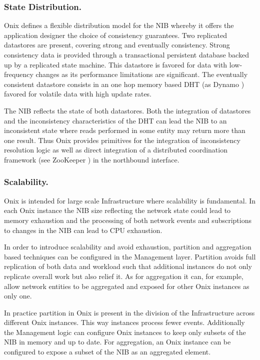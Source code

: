 \subsubsection{State Distribution.} Onix defines a flexible distribution model for the NIB 
whereby  it offers the application
designer the choice of consistency guarantees. Two
replicated datastores are present, covering  strong 
and  eventually consistency. Strong consistency data is
provided through a transactional persistent database backed up by a replicated
state machine. This datastore is
favored for data with low-frequency changes  as its performance limitations are
significant. The eventually consistent datastore consists in 
an one hop memory based DHT  (as Dynamo 
\cite{DeCandia:2007cn}) favored for  volatile data with high update
rates. 

The NIB reflects the state of both datastores. Both the integration of
datastores and the inconsistency  characteristics of the DHT can lead the
NIB to an inconsistent state where reads performed in some entity may
return more than one result. Thus Onix provides primitives
for the integration of inconsistency resolution logic as well as 
direct integration of a distributed
coordination framework (see  ZooKeeper \cite{Hunt:2010ux}) in the
northbound interface. 

\subsubsection{Scalability.} Onix is intended for large scale Infrastructure where scalability is
fundamental. In each Onix instance the NIB
size reflecting the network state could lead to memory
exhaustion   and the processing of both network events and
subscriptions 
to changes in  the NIB can lead to CPU exhaustion.

In order to introduce scalability and avoid exhaustion, partition and
aggregation based techniques can be configured in the Management
layer. Partition avoids full replication of both data  and workload
such that additional instances do not only replicate overall work but
also relief it. As for aggregation it can, for example, allow network entities to be
aggregated and exposed for other Onix instances as only one.

In practice partition in Onix is present in the division of the
Infrastructure across different Onix instances. 
This way
instances process fewer events. Additionally the Management logic can
configure Onix instances to keep only subsets of the NIB in memory and
up to date. For aggregation, an Onix instance can be configured to
expose a subset of the NIB as an aggregated element. 

